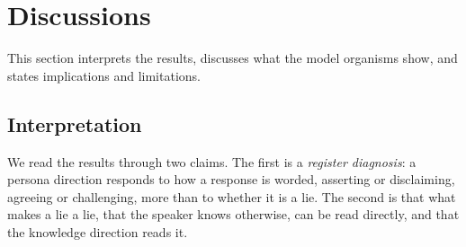\FloatBarrier
\section{Discussions}
\label{sec:discussion}

This section interprets the results, discusses what the model organisms show, and states implications
and limitations.

\subsection{Interpretation}
\label{sec:interpretation}

We read the results through two claims. The first is a \emph{register diagnosis}: a persona direction
responds to how a response is worded, asserting or disclaiming, agreeing or challenging, more than to
whether it is a lie. The second is that what makes a lie a lie, that the speaker knows otherwise, can
be read directly, and that the knowledge direction reads it.

